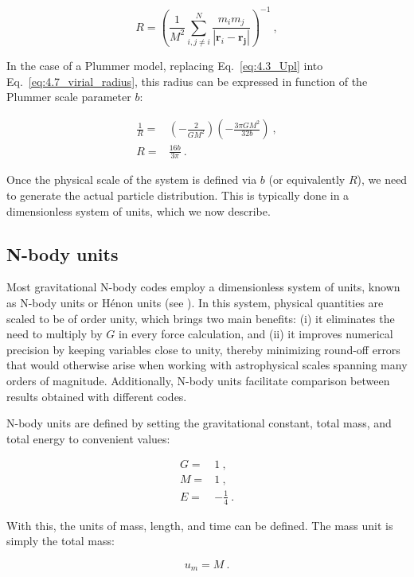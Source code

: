 \begin{equation}
	R = \left(\frac{1}{M^2} \sum_{i,j \neq i}^{N}\frac{m_i m_j}{|\mathbf{r}_i - \mathbf{r_j}|}\right)^{-1}~,
\end{equation}

In the case of a Plummer model, replacing Eq.~\ref{eq:4.3_Upl} into Eq.~\ref{eq:4.7_virial_radius}, this radius can be expressed in function of the Plummer scale parameter $b$:

\begin{align}
	\frac{1}{R} =& \left(-\frac{2}{GM^2}\right) \left(-\frac{3\pi GM^2}{32b}\right) ~,\\
	R =& \frac{16b}{3\pi}~.
\end{align}

Once the physical scale of the system is defined via $b$ (or equivalently $R$), we need to generate the actual particle distribution. This is typically done in a dimensionless system of units, which we now describe.

\subsection{N-body units}
\label{sec:4.2_Nbody_units}

Most gravitational N-body codes employ a dimensionless system of units, known as N-body units or Hénon units (see \citet{10.1007/BFb0116419}). In this system, physical quantities are scaled to be of order unity, which brings two main benefits: (i) it eliminates the need to multiply by $G$ in every force calculation, and (ii) it improves numerical precision by keeping variables close to unity, thereby minimizing round-off errors that would otherwise arise when working with astrophysical scales spanning many orders of magnitude. Additionally, N-body units facilitate comparison between results obtained with different codes.

N-body units are defined by setting the gravitational constant, total mass, and total energy to convenient values:

\begin{align}
	G =& 1 ~,\\
	M =& 1 ~,\\
	E =& -\frac{1}{4}~.
\end{align}

With this, the units of mass, length, and time can be defined. The mass unit is simply the total mass:

\begin{equation}
	u_m = M~.
\end{equation}

